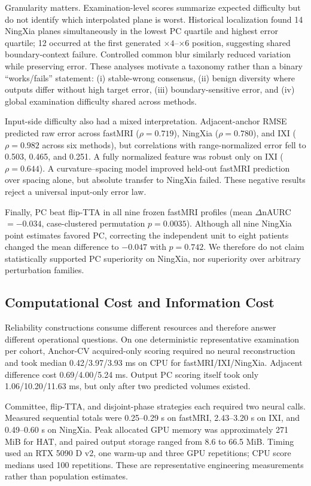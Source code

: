 \documentclass[journal,10pt]{IEEEtran}
\begin{document}
Granularity matters. Examination-level scores summarize expected difficulty but do not identify which interpolated plane is worst. Historical localization found 14 NingXia planes simultaneously in the lowest PC quartile and highest error quartile; 12 occurred at the first generated $\times4$--$\times6$ position, suggesting shared boundary-context failure. Controlled common blur similarly reduced variation while preserving error. These analyses motivate a taxonomy rather than a binary ``works/fails'' statement: (i) stable-wrong consensus, (ii) benign diversity where outputs differ without high target error, (iii) boundary-sensitive error, and (iv) global examination difficulty shared across methods.

Input-side difficulty also had a mixed interpretation. Adjacent-anchor RMSE predicted raw error across fastMRI ($\rho=0.719$), NingXia ($\rho=0.780$), and IXI ($\rho=0.982$ across six methods), but correlations with range-normalized error fell to 0.503, 0.465, and 0.251. A fully normalized feature was robust only on IXI ($\rho=0.644$). A curvature--spacing model improved held-out fastMRI prediction over spacing alone, but absolute transfer to NingXia failed. These negative results reject a universal input-only error law.

Finally, PC beat flip-TTA in all nine frozen fastMRI profiles (mean $\Delta$nAURC $=-0.034$, case-clustered permutation $p=0.0035$). Although all nine NingXia point estimates favored PC, correcting the independent unit to eight patients changed the mean difference to $-0.047$ with $p=0.742$. We therefore do not claim statistically supported PC superiority on NingXia, nor superiority over arbitrary perturbation families.

\subsection{Computational Cost and Information Cost}
Reliability constructions consume different resources and therefore answer different operational questions. On one deterministic representative examination per cohort, Anchor-CV acquired-only scoring required no neural reconstruction and took median 0.42/3.97/3.93 ms on CPU for fastMRI/IXI/NingXia. Adjacent difference cost 0.69/4.00/5.24 ms. Output PC scoring itself took only 1.06/10.20/11.63 ms, but only after two predicted volumes existed.

Committee, flip-TTA, and disjoint-phase strategies each required two neural calls. Measured sequential totals were 0.25--0.29 s on fastMRI, 2.43--3.20 s on IXI, and 0.49--0.60 s on NingXia. Peak allocated GPU memory was approximately 271 MiB for HAT, and paired output storage ranged from 8.6 to 66.5 MiB. Timing used an RTX 5090 D v2, one warm-up and three GPU repetitions; CPU score medians used 100 repetitions. These are representative engineering measurements rather than population estimates.
\end{document}
